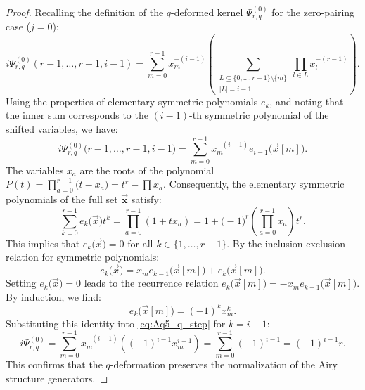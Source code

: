 \documentclass[reqno,11pt]{amsart}
\theoremstyle{plain}
\theoremstyle{definition}
\theoremstyle{remark}
\numberwithin{equation}{section}
\newcommand{\1}{\mathds{1}}
\newcommand{\2}{\frac{1}{2}}
\begin{document}
{\begin{proof}
					{Recalling the definition of the $q$-deformed kernel $\Psi^{(0)}_{r,q}$ for the zero-pairing case ($j=0$):
						\begin{equation}
							i \Psi^{(0)}_{r,q}(r-1, \dots, r-1, i-1) = \sum_{m=0}^{r-1} x_m^{-(i-1)} \left( \sum_{\substack{L \subseteq \{0, \dots, r-1\} \setminus \{m\} \\ |L|=i-1}} \prod_{l \in L} x_l^{-(r-1)} \right).
						\end{equation}
						Using the properties of elementary symmetric polynomials $e_k$, and noting that the inner sum corresponds to the $(i-1)$-th symmetric polynomial of the shifted variables, we have:
						\begin{equation}\label{eq:Aq5_q_step}
							i \Psi^{(0)}_{r,q}\big(r-1, \dots, r-1, i-1\big) = \sum_{m=0}^{r-1} x_m^{-(i-1)} e_{i-1}\big(\vec{{x}}[m]\big).
						\end{equation}
						The variables $x_a$ are the roots of the polynomial $P(t) = \prod_{a=0}^{r-1} \big(t - x_a\big) = t^r - \prod x_a$. Consequently, the elementary symmetric polynomials of the full set $\vec{\mathbf{x}}$ satisfy:
						\begin{equation}
							\sum_{k=0}^{r-1} e_k\big(\vec{{x}}\big) t^k = \prod_{a=0}^{r-1} (1 + t x_a) = 1 + \big(-1\big)^r \left( \prod_{a=0}^{r-1} x_a \right) t^r.
						\end{equation}
						This implies that $e_k\big(\vec{{x}}\big) = 0$ for all $k \in \{1, \dots, r-1\}$. By the inclusion-exclusion relation for symmetric polynomials:
						\begin{equation}
							e_k\big(\vec{{x}}\big) = x_m e_{k-1}\big(\vec{{x}}[m]\big) + e_k\big(\vec{{x}}[m]\big).
						\end{equation}
						Setting $e_k\big(\vec{{x}}\big) = 0$ leads to the recurrence relation $e_k\big(\vec{{x}}[m]\big) = -x_m e_{k-1}\big(\vec{{x}}[m]\big)$. By induction, we find:
						\begin{equation}
							e_k\big(\vec{{x}}[m]\big) = (-1)^k x_m^k.
						\end{equation}
						Substituting this identity into \eqref{eq:Aq5_q_step} for $k = i-1$:
						\begin{equation}
							i \Psi^{(0)}_{r,q} = \sum_{m=0}^{r-1} x_m^{-(i-1)} \left( (-1)^{i-1} x_m^{i-1} \right) = \sum_{m=0}^{r-1} (-1)^{i-1} = (-1)^{i-1} r.
						\end{equation}
						This confirms that the $q$-deformation preserves the normalization of the Airy structure generators.}
				\end{proof}
}
\end{document}

